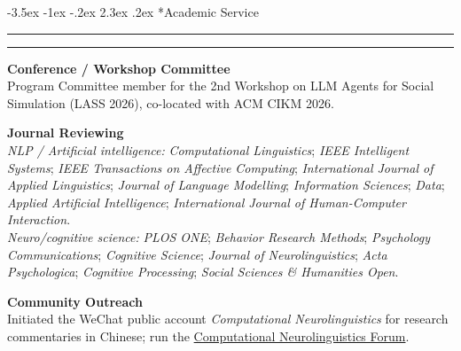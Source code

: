 \documentclass[11pt,a4paper]{article}
\makeatletter
\renewcommand\section{\@startsection{section}{1}{\z@}%
  {-3.5ex \@plus -1ex \@minus -.2ex}%
  {2.3ex \@plus.2ex}%
  {\normalfont\normalsize\bfseries}}
\makeatother
\begin{document}
\vspace{-1.2em}
\section*{Academic Service}
\vspace{-.5em}
\hrule
\vspace{0.3ex}
\hrule

\textbf{Conference / Workshop Committee}\\
Program Committee member for the 2nd Workshop on LLM Agents for Social Simulation (LASS 2026), co-located with ACM CIKM 2026.

\textbf{Journal Reviewing}\\
\textit{NLP / Artificial intelligence:} \textit{Computational Linguistics}; \textit{IEEE Intelligent Systems}; \textit{IEEE Transactions on Affective Computing}; \textit{International Journal of Applied Linguistics}; \textit{Journal of Language Modelling}; \textit{Information Sciences}; \textit{Data}; \textit{Applied Artificial Intelligence}; \textit{International Journal of Human-Computer Interaction}.\\
\textit{Neuro/cognitive science:} \textit{PLOS ONE}; \textit{Behavior Research Methods}; \textit{Psychology Communications}; \textit{Cognitive Science}; \textit{Journal of Neurolinguistics}; \textit{Acta Psychologica}; \textit{Cognitive Processing}; \textit{Social Sciences \& Humanities Open}.

\textbf{Community Outreach}\\
Initiated the WeChat public account \textit{Computational Neurolinguistics} for research commentaries in Chinese; run the \href{https://xufengduan.github.io/Computational-Neurolinguistics-Forum/}{Computational Neurolinguistics Forum}.

\end{document}
